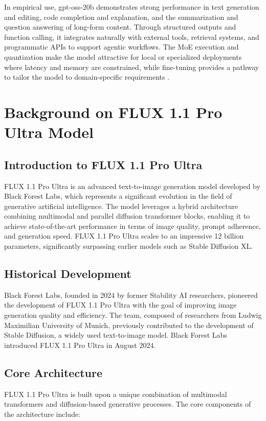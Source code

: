 In empirical use, gpt-oss-20b demonstrates strong performance in text generation and editing, code completion and explanation, and the summarization and question answering of long-form content. Through structured outputs and function calling, it integrates naturally with external tools, retrieval systems, and programmatic APIs to support agentic workflows. The MoE execution and quantization make the model attractive for local or specialized deployments where latency and memory are constrained, while fine-tuning provides a pathway to tailor the model to domain-specific requirements \cite{openai2025gptoss}.




\section{Background on FLUX 1.1 Pro Ultra Model}

\subsection{Introduction to FLUX 1.1 Pro Ultra}
FLUX 1.1 Pro Ultra is an advanced text-to-image generation model developed by Black Forest Labs, which represents a significant evolution in the field of generative artificial intelligence. The model leverages a hybrid architecture combining multimodal and parallel diffusion transformer blocks, enabling it to achieve state-of-the-art performance in terms of image quality, prompt adherence, and generation speed. FLUX 1.1 Pro Ultra scales to an impressive 12 billion parameters, significantly surpassing earlier models such as Stable Diffusion XL.

\subsection{Historical Development}
Black Forest Labs, founded in 2024 by former Stability AI researchers, pioneered the development of FLUX 1.1 Pro Ultra with the goal of improving image generation quality and efficiency. The team, composed of researchers from Ludwig Maximilian University of Munich, previously contributed to the development of Stable Diffusion, a widely used text-to-image model. Black Forest Labs introduced FLUX 1.1 Pro Ultra in August 2024.

\subsection{Core Architecture}
FLUX 1.1 Pro Ultra is built upon a unique combination of multimodal transformers and diffusion-based generative processes. The core components of the architecture include:

